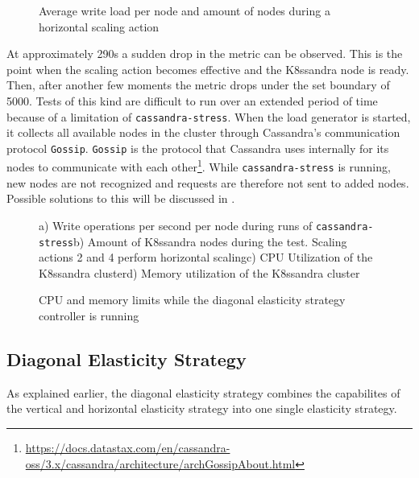 \begin{figure}[ht]
    \centering
    
    \caption{Average write load per node and amount of nodes during a horizontal scaling action}
    \label{fig:horizontal-elasticity}
\end{figure}

At approximately 290s a sudden drop in the metric can be observed. This is the point when the scaling action becomes effective and the K8ssandra node is ready. Then, after another few moments the metric drops under the set boundary of 5000. Tests of this kind are difficult to run over an extended period of time because of a limitation of \texttt{cassandra-stress}. When the load generator is started, it collects all available nodes in the cluster through Cassandra's communication protocol \texttt{Gossip}. \texttt{Gossip} is the protocol that Cassandra uses internally for its nodes to communicate with each other\footnote{\raggedright\url{https://docs.datastax.com/en/cassandra-oss/3.x/cassandra/architecture/archGossipAbout.html}}. While \texttt{cassandra-stress} is running, new nodes are not recognized and requests are therefore not sent to added nodes. Possible solutions to this will be discussed in .

\begin{figure}[H]
    \centering
    
  \caption{a) Write operations per second per node during runs of \texttt{cassandra-stress}\qquad b) Amount of K8ssandra nodes during the test. Scaling actions 2 and 4 perform horizontal scaling\qquad c) CPU Utilization of the K8ssandra cluster\qquad d) Memory utilization of the K8ssandra cluster}
    \label{fig:diagonal-elasticity}
\end{figure}

\begin{figure}[H]
    \centering
    
    \caption{CPU and memory limits while the diagonal elasticity strategy controller is running}
    \label{fig:diagonal-elasticity-limits}
\end{figure}

\subsection{Diagonal Elasticity Strategy}

As explained earlier, the diagonal elasticity strategy combines the capabilites of the vertical and horizontal elasticity strategy into one single elasticity strategy.

